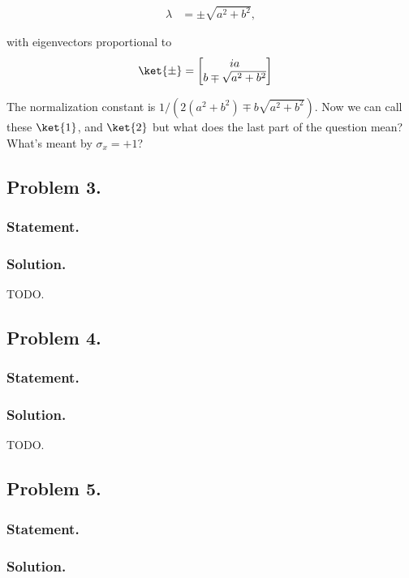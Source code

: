 \begin{align}\label{eqn:desaiCh5:202}
\lambda &= \pm \sqrt{a^2 + b^2},
\end{align}

with eigenvectors proportional to
\begin{align}\label{eqn:desaiCh5:203}
\ket{\pm} &= 
\begin{bmatrix}
i a \\
b \mp \sqrt{a^2 + b^2}
\end{bmatrix}
\end{align}

The normalization constant is $1/(2 (a^2 + b^2) \mp b \sqrt{a^2 + b^2})$.  Now we can call these $\ket{1}$, and $\ket{2}$ but what does the last part of the question mean?  What's meant by $\sigma_x = +1$?

\subsection{Problem 3.}
\subsubsection{Statement.}
\subsubsection{Solution.}

TODO.

\subsection{Problem 4.}
\subsubsection{Statement.}
\subsubsection{Solution.}

TODO.

\subsection{Problem 5.}
\subsubsection{Statement.}
\subsubsection{Solution.}

